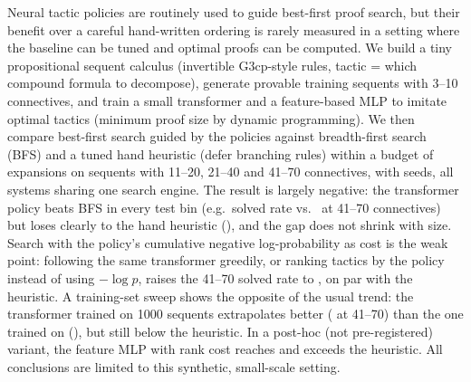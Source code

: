 Neural tactic policies are routinely used to guide best-first proof search, but their benefit over a careful hand-written ordering is rarely measured in a setting where the baseline can be tuned and optimal proofs can be computed.
We build a tiny propositional sequent calculus (invertible G3cp-style rules, tactic = which compound formula to decompose), generate  provable training sequents with 3--10 connectives, and train a small transformer and a feature-based MLP to imitate optimal tactics (minimum proof size by dynamic programming).
We then compare best-first search guided by the policies against breadth-first search (BFS) and a tuned hand heuristic (defer branching rules) within a budget of  expansions on sequents with 11--20, 21--40 and 41--70 connectives, with  seeds, all systems sharing one search engine.
The result is largely negative: the transformer policy beats BFS in every test bin (e.g.\ solved rate  vs.\  at 41--70 connectives) but loses clearly to the hand heuristic (), and the gap does not shrink with size.
Search with the policy's cumulative negative log-probability as cost is the weak point: following the same transformer greedily, or ranking tactics by the policy instead of using $-\log p$, raises the 41--70 solved rate to , on par with the heuristic.
A training-set sweep shows the opposite of the usual trend: the transformer trained on 1000 sequents extrapolates better ( at 41--70) than the one trained on  (), but still below the heuristic.
In a post-hoc (not pre-registered) variant, the feature MLP with rank cost reaches  and exceeds the heuristic.
All conclusions are limited to this synthetic, small-scale setting.
